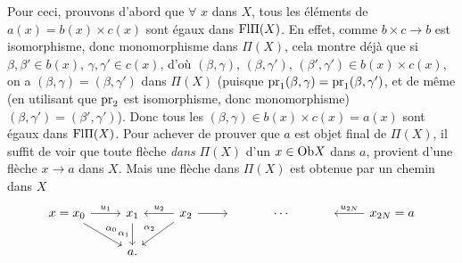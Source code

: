 Pour ceci, prouvons d'abord que $\forall$ $x$ dans $X$, tous les éléments de $a(x) = b(x)\times c(x)$ sont égaux dans $\mathrm{Fl}\Pi(X)$. En effet, comme $b\times c \longrightarrow b$ est isomorphisme, donc monomorphisme dans $\Pi(X)$, cela montre déjà que si $\beta,\beta'\in b(x)$, $\gamma,\gamma'\in c(x)$, d'où $(\beta,\gamma)$, $(\beta,\gamma')$, $(\beta',\gamma')\in b(x)\times c(x)$, on a $(\beta,\gamma) = (\beta,\gamma')$ dans $\Pi(X)$ (puisque $\mathrm{pr}_1(\beta,\gamma) = \mathrm{pr}_1(\beta,\gamma')$, et de même (en utilisant que $\mathrm{pr}_2$ est isomorphisme, donc monomorphisme) $(\beta,\gamma') = (\beta',\gamma')$). Donc tous les $(\beta,\gamma)\in b(x)\times c(x) = a(x)$ sont égaux dans $\mathrm{Fl}\Pi(X)$. Pour achever de prouver que $a$ est objet final de $\Pi(X)$, il suffit de voir que toute flèche \textit{dans} $\Pi(X)$ d'un $x\in\mathrm{Ob} X$ dans $a$, provient d'une flèche $x\longrightarrow a$ dans $X$. Mais une flèche dans $\Pi(X)$ est obtenue par un chemin dans $X$
\[
\begin{tikzcd}
x = x_0 \arrow[r, "u_1"] \arrow[dr, "\alpha_0"] & x_1 \arrow[d, "\alpha_1"'] & x_2 \arrow[l, "u_2"'] \arrow[r] \arrow[dl, "\alpha_2"'] & {} & \cdots & {} & x_{2N} = a \arrow[l, "u_{2N}"'] \\
& a. & & & & &
\end{tikzcd}
\]

